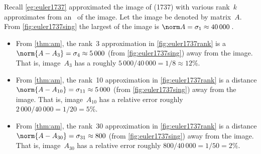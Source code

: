 \begin{example} \label{eg:}
Recall \autoref{eg:euler1737} approximated the image of  (1737) with various rank~\(k\) approximates from an \svd\ of the image.
Let the image be denoted by matrix~\(A\).
From \autoref{fig:euler1737sing} the largest  of the image is \(\norm A=\sigma_1\approx40\,000\)\,.
\begin{itemize}
\item From  \autoref{thm:am}, the rank~3 approximation in \autoref{fig:euler1737rank} is a  \(\norm{A-A_3}=\sigma_4\approx 5\,000\) (from \autoref{fig:euler1737sing}) away from the image.  
That is, image~\(A_3\) has a  roughly \(5\,000/40\,000=1/8\approx 12\%\).
\item From  \autoref{thm:am}, the rank~10 approximation in \autoref{fig:euler1737rank} is a distance \(\norm{A-A_{10}}=\sigma_{11}\approx 5\,000\) (from \autoref{fig:euler1737sing}) away from the image.  
That is, image~\(A_{10}\) has a relative error roughly \(2\,000/40\,000=1/20= 5\%\). 
\item From  \autoref{thm:am}, the rank~30 approximation in \autoref{fig:euler1737rank} is a distance \(\norm{A-A_{30}}=\sigma_{31}\approx 800\) (from \autoref{fig:euler1737sing}) away from the image.  
That is, image~\(A_{30}\) has a relative error roughly \(800/40\,000=1/50= 2\%\). 
\end{itemize}
\end{example}


